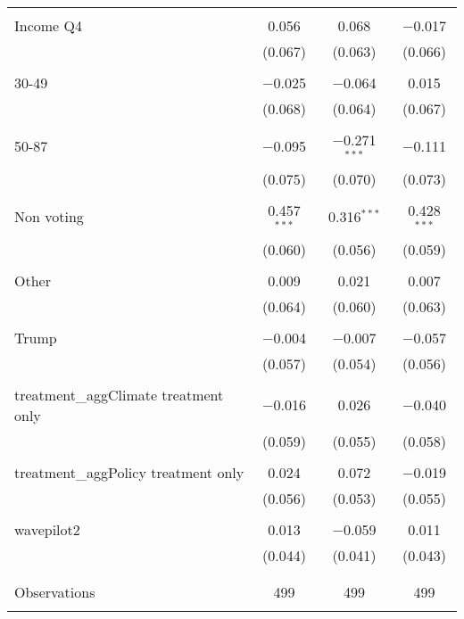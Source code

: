 \begin{tabular}{@{\extracolsep{5pt}}lccc}
  & & & \\ 
 Income Q4 & 0.056 & 0.068 & $-$0.017 \\ 
  & (0.067) & (0.063) & (0.066) \\ 
  & & & \\ 
 30-49 & $-$0.025 & $-$0.064 & 0.015 \\ 
  & (0.068) & (0.064) & (0.067) \\ 
  & & & \\ 
 50-87 & $-$0.095 & $-$0.271$^{***}$ & $-$0.111 \\ 
  & (0.075) & (0.070) & (0.073) \\ 
  & & & \\ 
 Non voting & 0.457$^{***}$ & 0.316$^{***}$ & 0.428$^{***}$ \\ 
  & (0.060) & (0.056) & (0.059) \\ 
  & & & \\ 
 Other & 0.009 & 0.021 & 0.007 \\ 
  & (0.064) & (0.060) & (0.063) \\ 
  & & & \\ 
 Trump & $-$0.004 & $-$0.007 & $-$0.057 \\ 
  & (0.057) & (0.054) & (0.056) \\ 
  & & & \\ 
 treatment\_aggClimate treatment only & $-$0.016 & 0.026 & $-$0.040 \\ 
  & (0.059) & (0.055) & (0.058) \\ 
  & & & \\ 
 treatment\_aggPolicy treatment only & 0.024 & 0.072 & $-$0.019 \\ 
  & (0.056) & (0.053) & (0.055) \\ 
  & & & \\ 
 wavepilot2 & 0.013 & $-$0.059 & 0.011 \\ 
  & (0.044) & (0.041) & (0.043) \\ 
  & & & \\ 
\hline \\[-1.8ex] 

Observations & 499 & 499 & 499 \\ 
\hline 
\hline \\[-1.8ex] 
\end{tabular} 